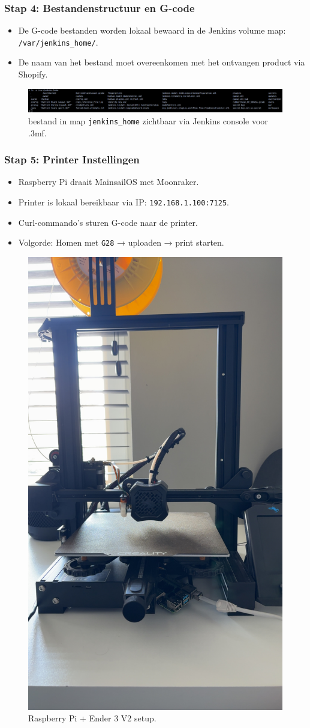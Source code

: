 \begin{enumerate}
\subsubsection{Stap 4: Bestandenstructuur en G-code}
\begin{itemize}
    \item De G-code bestanden worden lokaal bewaard in de Jenkins volume map: \texttt{/var/jenkins\_home/}.
    \item De naam van het bestand moet overeenkomen met het ontvangen product via Shopify.
\end{itemize}

\vspace{0.5em}
\begin{figure}[H]
    \centering
    \includegraphics[width=1\linewidth]{foto's/JenkinsHome.png}
    \caption{bestand in map \texttt{jenkins\_home} zichtbaar via Jenkins console voor .3mf.}
    \label{fig:Jenkins_home}
\end{figure}

\subsubsection{Stap 5: Printer Instellingen}
\begin{itemize}
    \item Raspberry Pi draait MainsailOS met Moonraker.
    \item Printer is lokaal bereikbaar via IP: \texttt{192.168.1.100:7125}.
    \item Curl-commando’s sturen G-code naar de printer.
    \item Volgorde: Homen met \texttt{G28} → uploaden → print starten.
\end{itemize}

\vspace{0.5em}
\begin{figure}[H]
    \centering
    \includegraphics[width=0.3\linewidth]{foto's/Ender3WithRaspberryPi.JPG}
    \caption{Raspberry Pi + Ender 3 V2 setup.}
    \label{fig:3Dprinter}
\end{figure}


\end{enumerate}
